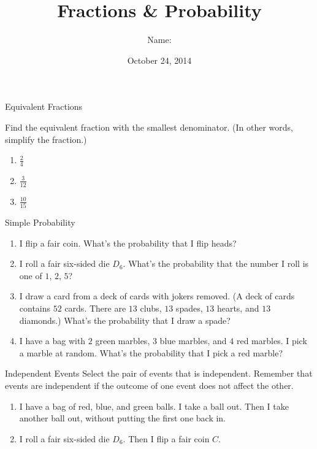 \documentclass[12pt,letterpaper]{article}
\title{Fractions \& Probability}
\author{Name: \underline{\hspace{5cm}}}
\date{October 24, 2014}
\begin{document}
\maketitle

\thispagestyle{empty}

\begin{problem}{Equivalent Fractions}

 Find the equivalent fraction with the smallest denominator. (In other words,
 simplify the fraction.)

 \begin{enumerate}[\hspace{.5cm}a.]
  \item $\frac{2}{4}$
  \item $\frac{3}{12}$
  \item $\frac{10}{15}$
 \end{enumerate}
\end{problem}

\begin{problem}{Simple Probability}
 \begin{enumerate}[\hspace{.5cm}a.]
  \item I flip a fair coin. What's the probability that I flip heads?
  \item I roll a fair six-sided die $D_6$. What's the probability that the
  number I roll is one of $1$, $2$, $5$?
  \item I draw a card from a deck of cards with jokers removed. (A deck of cards
  contains $52$ cards. There are $13$ clubs, $13$ spades, $13$ hearts, and $13$
  diamonds.) What's the probability that I draw a spade?
  \item I have a bag with $2$ green marbles, $3$ blue marbles, and $4$ red
  marbles. I pick a marble at random. What's the probability that I pick a red
  marble?
 \end{enumerate}
\end{problem}

\begin{problem}{Independent Events}
Select the pair of events that is independent. Remember that events are
independent if the outcome of one event does not affect the other.

 \begin{enumerate}[\hspace{.5cm}a.]
  \item I have a bag of red, blue, and green balls. I take a ball out. Then I
  take another ball out, without putting the first one back in.
  \item I roll a fair six-sided die $D_6$. Then I flip a fair coin $C$.
 \end{enumerate}
\end{problem}
\end{document}
